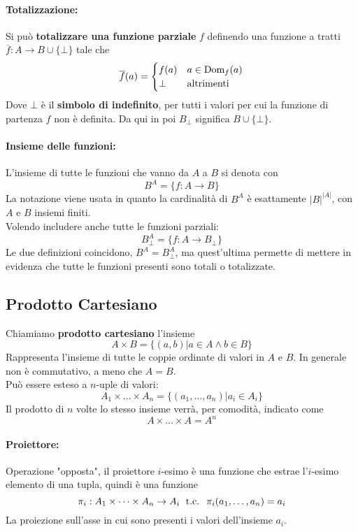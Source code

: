\paragraph{Totalizzazione:} Si può \textbf{totalizzare una funzione parziale} $f$ definendo una funzione a tratti $\overline{f}: A \rightarrow B \cup \{\bot\}$ tale che
$$ 
\overline{f} (a) = \begin{cases}
	f(a) & a \in \text{Dom}_f(a) \\
	\bot & \text{altrimenti}
\end{cases}
$$
Dove $\bot$ è il \textbf{simbolo di indefinito}, per tutti i valori per cui la funzione di partenza $f$ non è definita. Da qui in poi $B_\bot$ significa $B \cup \{\bot\}$.\\

\paragraph{Insieme delle funzioni:} L'insieme di tutte le funzioni che vanno da $A$ a $B$ si denota con
$$ B^A = \{f: A \rightarrow B \} $$
La notazione viene usata in quanto la cardinalità di $B^A$ è esattamente $|B|^{|A|}$, con $A$ e $B$ insiemi finiti.\\
Volendo includere anche tutte le funzioni parziali: 
$$ B^A_\bot = \{f: A \rightarrow B_\bot \} $$
Le due definizioni coincidono, $B^A = B^A_\bot$, ma quest'ultima permette di mettere in evidenza che tutte le funzioni presenti sono totali o totalizzate.\\ 

\subsection{Prodotto Cartesiano}

Chiamiamo \textbf{prodotto cartesiano} l'insieme 
$$ A \times B = \{(a,b) | a \in A \wedge b \in B \} $$
Rappresenta l'insieme di tutte le coppie ordinate di valori in $A$ e $B$. In generale non è commutativo, a meno che $A=B$.\\

Può essere esteso a $n$-uple di valori:
$$ A_1 \times \dots \times A_n = \{(a_1, \dots, a_n) | a_i \in A_i\} $$
Il prodotto di $n$ volte lo stesso insieme verrà, per comodità, indicato come
$$ A \times \dots \times A = A^n $$

\paragraph{Proiettore:} Operazione "opposta", il proiettore $i$-esimo è una funzione che estrae l'$i$-esimo elemento di una tupla, quindi è una funzione
$$ \pi_i: A_1 \times \dots \times A_n \rightarrow A_i \; \text{ t.c. } \; \pi_i (a_1, \dots, a_n) = a_i $$
La proiezione sull'asse in cui sono presenti i valori dell'insieme $a_i$.\\

